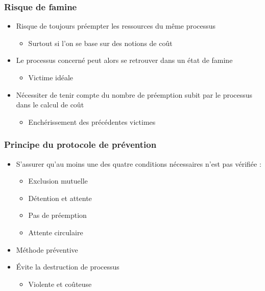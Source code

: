 \begin{frame}
\frametitle{Risque de famine}
\begin{itemize}
\item <1->Risque de toujours préempter les ressources du même processus
\begin{itemize}
\item Surtout si l’on se base sur des notions de coût
\end{itemize}
\item <2-> Le processus concerné peut alors se retrouver dans un état de famine
\begin{itemize}
\item Victime idéale
\end{itemize}
\item <3->Nécessiter de tenir compte du nombre de préemption subit par le processus dans le calcul de coût
\begin{itemize}
\item Enchérissement des précédentes victimes
\end{itemize}
\end{itemize}
\end{frame}

\begin{frame}
\frametitle{Principe du protocole de prévention}
\begin{itemize}
\item S’assurer qu’au moins une des quatre conditions nécessaires n’est pas vérifiée :
\begin{itemize}
\item Exclusion mutuelle
\item Détention et attente
\item Pas de préemption
\item Attente circulaire
\end{itemize}
\item Méthode préventive
\item Évite la destruction de processus
\begin{itemize}
\item Violente et coûteuse
\end{itemize}
\end{itemize}
\end{frame}

